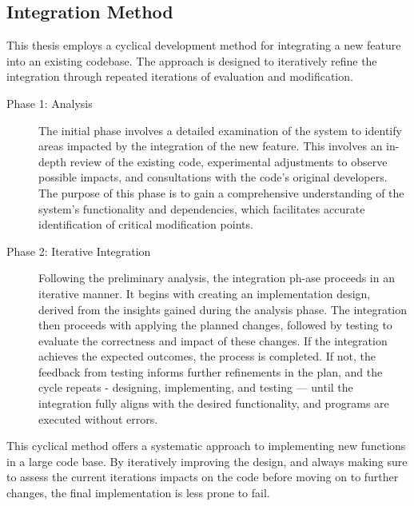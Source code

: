 

\subsection{Integration Method}

This thesis employs a cyclical development method for integrating a new feature into an existing codebase. The approach is designed to iteratively refine the integration through repeated iterations of evaluation and modification.

\begin{description}
  \item[Phase 1: Analysis]
  The initial phase involves a detailed examination of the system to identify areas impacted by the integration of the new feature. This involves an in-depth review of the existing code, experimental adjustments to observe possible impacts, and consultations with the code's original developers. The purpose of this phase is to gain a comprehensive understanding of the system's functionality and dependencies, which facilitates accurate identification of critical modification points.
  
  \item[Phase 2: Iterative Integration]
  Following the preliminary analysis, the integration ph-ase proceeds in an iterative manner. It begins with creating an implementation design, derived from the insights gained during the analysis phase. The integration then proceeds with applying the planned changes, followed by testing to evaluate the correctness and impact of these changes. If the integration achieves the expected outcomes, the process is completed. If not, the feedback from testing informs further refinements in the plan, and the cycle repeats - designing, implementing, and testing — until the integration fully aligns with the desired functionality, and programs are executed without errors.
\end{description}

This cyclical method offers a systematic approach to implementing new functions in a large code base. By iteratively improving the design, and always making sure to assess the current iterations impacts on the code before moving on to further changes, the final implementation is less prone to fail.



